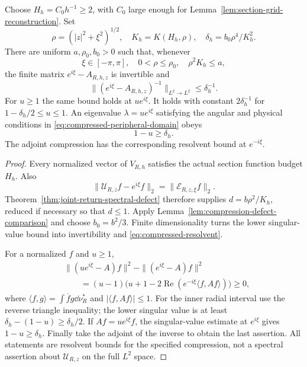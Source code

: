 \begin{theorem}
\label{thm:compressed-peripheral-resolvent}
Choose $H_h=C_0h^{-1}\ge2$, with $C_0$ large enough for
Lemma~\ref{lem:section-grid-reconstruction}. Set
\[
 \rho=(|z|^2+\xi^2)^{1/2},\quad K_h=K(H_h,\rho),\quad
 \delta_h=b_0\rho^4/K_h^2.
\]
There are uniform $a,\rho_0,b_0>0$ such that, whenever
\begin{equation}\label{eq:compressed-peripheral-domain}
 \xi\in[-\pi,\pi],\quad0<\rho\le\rho_0,\quad \rho^2K_h\le a,
\end{equation}
the finite matrix $e^{i\xi}-A_{R,h,z}$ is invertible and
\begin{equation}\label{eq:compressed-resolvent}
 \|(e^{i\xi}-A_{R,h,z})^{-1}\|_{L^2\to L^2}
                                     \le\delta_h^{-1}.
\end{equation}
For $u\ge1$ the same bound holds at $ue^{i\xi}$. It holds with
constant $2\delta_h^{-1}$ for $1-\delta_h/2\le u\le1$.
An eigenvalue $\lambda=ue^{i\xi}$ satisfying the angular and physical
conditions in \eqref{eq:compressed-peripheral-domain} obeys
\begin{equation}\label{eq:compressed-eigenvalue-gap}
 1-u\ge\delta_h.
\end{equation}
The adjoint compression has the corresponding resolvent bound at
$e^{-i\xi}$.
\end{theorem}
\begin{proof}
Every normalized vector of $V_{R,h}$ satisfies the actual section
function budget $H_h$. Also
\[
 \|\mathcal U_{R,z}f-e^{i\xi}f\|_2
                         =\|\mathcal E_{R,z,\xi}f\|_2.
\]
Theorem~\ref{thm:joint-return-spectral-defect} therefore supplies
$d=b\rho^2/K_h$, reduced if necessary so that $d\le1$.
Apply Lemma~\ref{lem:compression-defect-comparison} and choose
$b_0=b^2/3$. Finite dimensionality turns the lower singular-value
bound into invertibility and \eqref{eq:compressed-resolvent}.

For a normalized $f$ and $u\ge1$,
\begin{align*}
 &\|(ue^{i\xi}-A)f\|^2-\|(e^{i\xi}-A)f\|^2\\
 &\qquad=(u-1)\bigl(u+1-2\operatorname{Re}
                         (e^{-i\xi}\langle f,Af\rangle)\bigr)\ge0,
\end{align*}
where $\langle f,g\rangle=\int\overline f g\dd\nu_R^*$ and
$|\langle f,Af\rangle|\le1$.
For the inner radial interval use the reverse triangle inequality;
the lower singular value is at least $\delta_h-(1-u)\ge\delta_h/2$.
If $Af=ue^{i\xi}f$, the singular-value estimate at $e^{i\xi}$ gives
$1-u\ge\delta_h$. Finally take the adjoint of the inverse to obtain
the last assertion. All statements are resolvent bounds for the
specified compression, not a spectral assertion about $\mathcal U_{R,z}$
on the full $L^2$ space.
\end{proof}

